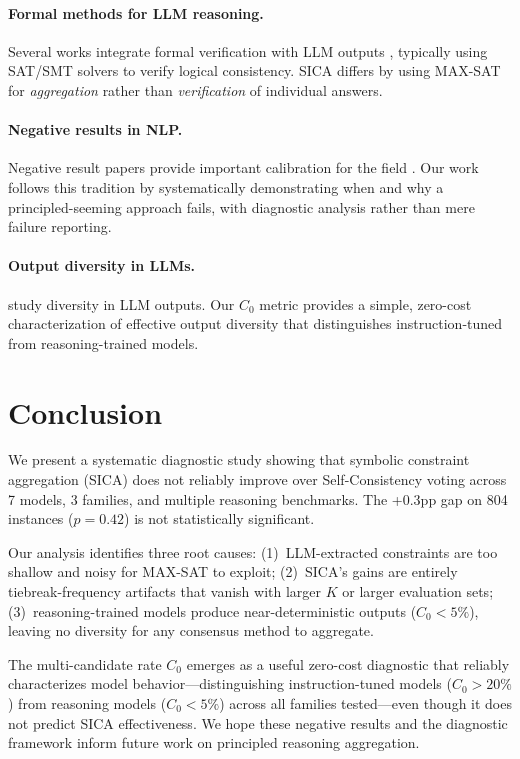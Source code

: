 \documentclass[11pt,a4paper]{article}
\begin{document}
\paragraph{Formal methods for LLM reasoning.}
Several works integrate formal verification with LLM outputs \cite{pan2023logiclm,ye2023satlm}, typically using SAT/SMT solvers to verify logical consistency.
SICA differs by using MAX-SAT for \emph{aggregation} rather than \emph{verification} of individual answers.

\paragraph{Negative results in NLP.}
Negative result papers provide important calibration for the field \cite{rogers2020primer}.
Our work follows this tradition by systematically demonstrating when and why a principled-seeming approach fails, with diagnostic analysis rather than mere failure reporting.

\paragraph{Output diversity in LLMs.}
\citet{li2024common} study diversity in LLM outputs.
Our $C_0$ metric provides a simple, zero-cost characterization of effective output diversity that distinguishes instruction-tuned from reasoning-trained models.

\section{Conclusion}
\label{sec:conclusion}

We present a systematic diagnostic study showing that symbolic constraint aggregation (SICA) does not reliably improve over Self-Consistency voting across 7 models, 3 families, and multiple reasoning benchmarks.
The +0.3pp gap on 804 instances ($p=0.42$) is not statistically significant.

Our analysis identifies three root causes:
(1)~LLM-extracted constraints are too shallow and noisy for MAX-SAT to exploit;
(2)~SICA's gains are entirely tiebreak-frequency artifacts that vanish with larger $K$ or larger evaluation sets;
(3)~reasoning-trained models produce near-deterministic outputs ($C_0<5\%$), leaving no diversity for any consensus method to aggregate.

The multi-candidate rate $C_0$ emerges as a useful zero-cost diagnostic that reliably characterizes model behavior---distinguishing instruction-tuned models ($C_0>20\%$) from reasoning models ($C_0<5\%$) across all families tested---even though it does not predict SICA effectiveness.
We hope these negative results and the diagnostic framework inform future work on principled reasoning aggregation.
\end{document}
